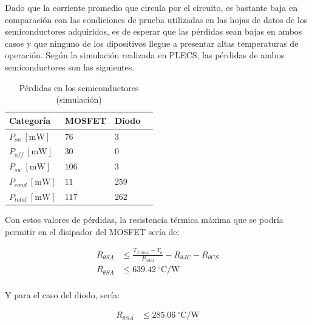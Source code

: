 \documentclass[conference]{IEEEtran}
\begin{document}
Dado que la corriente promedio que circula por el circuito, es bastante baja en comparación con las condiciones de prueba
utilizadas en las hojas de datos de los semiconductores adquiridos, es de esperar que las pérdidas sean bajas en ambos casos y que ninguno de los dipositivos 
llegue a presentar altas temperaturas de operación. Según la simulación realizada en PLECS, las pérdidas de ambos semiconductores son las siguientes.


\begin{table}[H]
    \centering
    \renewcommand{\arraystretch}{1.5}
    \begin{tabularx}{\columnwidth}{
        >{\hsize=1.3\hsize}X 
        >{\hsize=0.70\hsize}X 
        >{\hsize=0.75\hsize}X 
        >{\hsize=0.75\hsize}X
    }
        \toprule
        Categoría                & MOSFET & Diodo  \\
        \midrule
        $P_{on}~\mathrm{[mW]}$    & $76$  & $3$     \\
        $P_{off}~\mathrm{[mW]}$   & $30$  & $0$     \\
        $P_{sw}~\mathrm{[mW]}$    & $106$ & $3$     \\
        $P_{cond}~\mathrm{[mW]}$  & $11$  & $259$   \\
        $P_{total}~\mathrm{[mW]}$ & $117$ & $262$   \\

        \bottomrule
    \end{tabularx}
    \caption{Pérdidas en los semiconductores (simulación)}
    \label{tab:semiconductors_losses}
\end{table}

Con estos valores de pérdidas, la resistencia térmica máxima que se podría permitir en el disipador
del MOSFET sería de:


\begin{equation}
\begin{aligned}
    R_{\theta SA} &\leq \frac{T_{J,max} - T_a}{P_{total}} - R_{\theta JC} - R_{\theta CS} \\
    R_{\theta SA} &\leq 639.42~^\circ\mathrm{C/W} \\
\end{aligned}
\end{equation}

Y para el caso del diodo, sería:


\begin{equation}
\begin{aligned}
    R_{\theta SA} &\leq 285.06~^\circ\mathrm{C/W} \\
\end{aligned}
\end{equation}
\end{document}
